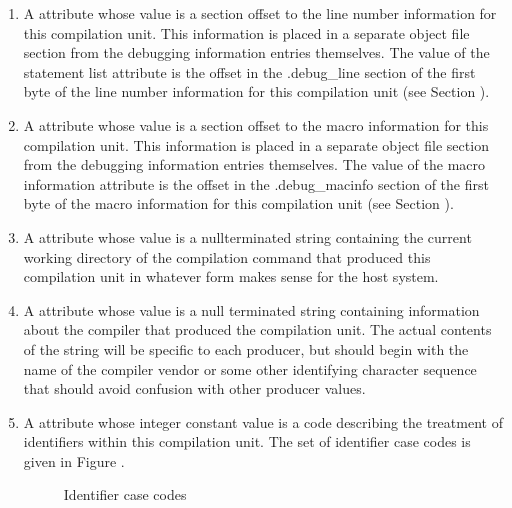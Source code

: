 \begin{enumerate}[1]
\item A  attribute whose value is a section
offset to the line number information for this compilation
unit.  This information is placed in a separate object file
section from the debugging information entries themselves. The
value of the statement list attribute is the offset in the
.debug\_line section of the first byte of the line number
information for this compilation unit 
(see Section ).

\item A  attribute whose value is a section
offset to the macro information for this compilation unit.
This information is placed in a separate object file section
from the debugging information entries themselves. The
value of the macro information attribute is the offset in
the .debug\_macinfo section of the first byte of the macro
information for this compilation unit 
(see Section ).

\item  A  attribute whose value is a
null\dash terminated string containing the current working directory
of the compilation command that produced this compilation
unit in whatever form makes sense for the host system.

\item  A  attribute whose value is a null\dash
terminated string containing information about the compiler
that produced the compilation unit. The actual contents of
the string will be specific to each producer, but should
begin with the name of the compiler vendor or some other
identifying character sequence that should avoid confusion
with other producer values.


\item  A  attribute whose integer
constant value is a code describing the treatment
of identifiers within this compilation unit. The
set of identifier case codes is given in Figure
.

\begin{figure}[here]
\caption{Identifier case codes}\label{fig:identifiercasecodes}
\end{figure}


\end{enumerate}
